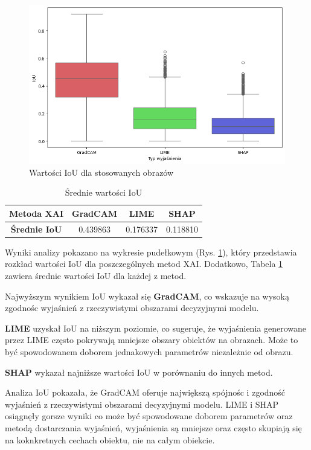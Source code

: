 \begin{figure}[h]
	\centering\includegraphics[width=.9\textwidth]{img/base_iou}
	\caption{Wartości IoU  dla stosowanych obrazów}  \label{rys:basiciou}
\end{figure}

\begin{table}[h]
	\centering
	\begin{tabular}{|c|c|c|c|}
		\hline
		\textbf{Metoda XAI}  & \textbf{GradCAM} & \textbf{LIME} & \textbf{SHAP} \\
		\hline
		\textbf{Średnie IoU} & 0.439863         & 0.176337      & 0.118810      \\
		\hline
	\end{tabular}
	\caption{Średnie wartości IoU}
	\label{tab:basiciou}
\end{table}


Wyniki analizy pokazano na wykresie pudełkowym (Rys. \ref{rys:basiciou}), który przedstawia rozkład wartości IoU dla poszczególnych metod XAI.
Dodatkowo, Tabela \ref{tab:basiciou} zawiera średnie wartości IoU dla każdej z metod.

Najwyższym wynikiem IoU wykazał się \textbf{GradCAM}, co wskazuje na wysoką zgodnośc wyjaśnień z rzeczywistymi obszarami decyzyjnymi modelu.

\textbf{LIME} uzyskał IoU na niższym poziomie, co sugeruje, że wyjaśnienia generowane przez LIME często pokrywają mniejsze obszary obiektów na obrazach.
Może to być spowodowanem doborem jednakowych parametrów niezależnie od obrazu.

\textbf{SHAP} wykazał najniższe wartości IoU w porównaniu do innych metod.

Analiza IoU pokazała, że GradCAM oferuje największą spójnośc i zgodność wyjaśnień z rzeczywistymi obszarami decyzyjnymi modelu.
LIME i SHAP osiągnęły gorsze wyniki co może być spowodowane doborem parametrów oraz metodą dostarczania wyjaśnień, wyjaśnienia są mniejsze oraz często skupiają się na koknkretnych cechach obiektu, nie na całym obiekcie.

